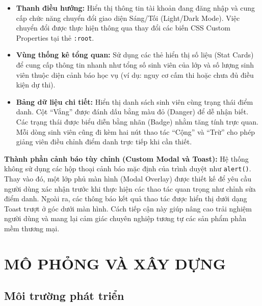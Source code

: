 \documentclass[12pt,a4paper]{report}
\begin{document}
\begin{itemize}
\item \textbf{Thanh điều hướng:} Hiển thị thông tin tài khoản đang đăng nhập và cung cấp chức năng chuyển đổi giao diện Sáng/Tối (Light/Dark Mode). Việc chuyển đổi được thực hiện thông qua thay đổi các biến CSS Custom Properties tại thẻ \texttt{:root}.

\item \textbf{Vùng thống kê tổng quan:} Sử dụng các thẻ hiển thị số liệu (Stat Cards) để cung cấp thông tin nhanh như tổng số sinh viên của lớp và số lượng sinh viên thuộc diện cảnh báo học vụ (ví dụ: nguy cơ cấm thi hoặc chưa đủ điều kiện dự thi).

\item \textbf{Bảng dữ liệu chi tiết:} Hiển thị danh sách sinh viên cùng trạng thái điểm danh. Cột ``Vắng'' được đánh dấu bằng màu đỏ (Danger) để dễ nhận biết. Các trạng thái được biểu diễn bằng nhãn (Badge) nhằm tăng tính trực quan. Mỗi dòng sinh viên cũng đi kèm hai nút thao tác ``Cộng'' và ``Trừ'' cho phép giảng viên điều chỉnh điểm danh trực tiếp khi cần thiết.
\end{itemize}

\textbf{Thành phần cảnh báo tùy chỉnh (Custom Modal và Toast):}  
Hệ thống không sử dụng các hộp thoại cảnh báo mặc định của trình duyệt như \texttt{alert()}. Thay vào đó, một lớp phủ màn hình (Modal Overlay) được thiết kế để yêu cầu người dùng xác nhận trước khi thực hiện các thao tác quan trọng như chỉnh sửa điểm danh. Ngoài ra, các thông báo kết quả thao tác được hiển thị dưới dạng Toast trượt ở góc dưới màn hình. Cách tiếp cận này giúp nâng cao trải nghiệm người dùng và mang lại cảm giác chuyên nghiệp tương tự các sản phẩm phần mềm thương mại.

\chapter{MÔ PHỎNG VÀ XÂY DỰNG}

\section{Môi trường phát triển}
\end{document}
